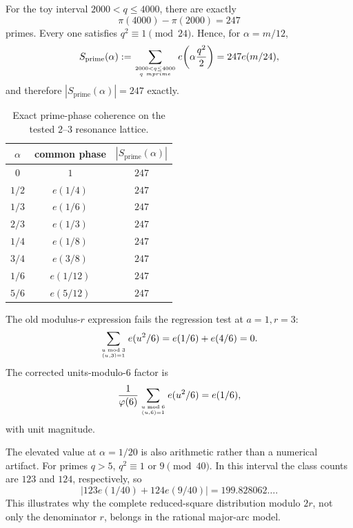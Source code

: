 \documentclass[11pt]{article}
\theoremstyle{definition}
\theoremstyle{remark}
\newcommand{\1}{\mathbf{1}}
\begin{document}
For the toy interval $2000<q\le4000$, there are exactly
\begin{equation}
 \pi(4000)-\pi(2000)=247
 \label{eq:toy-prime-count}
\end{equation}
primes.  Every one satisfies $q^2\equiv1\pmod{24}$.  Hence, for
$\alpha=m/12$,
\begin{equation}
 S_{\mathrm{prime}}(\alpha)
 :=\sum_{2000<q\le4000\atop q\ {
m prime}}
 e\!\left(\alpha\frac{q^2}{2}\right)
 =247e(m/24),
 \label{eq:toy-prime-resonance}
\end{equation}
and therefore $|S_{\mathrm{prime}}(\alpha)|=247$ exactly.

\begin{table}[htbp]
\centering
\caption{Exact prime-phase coherence on the tested $2$--$3$ resonance lattice.}
\label{tab:toy-prime-resonance}
\small
\begin{tabular}{ccc}
\toprule
$\alpha$ & common phase & $|S_{\mathrm{prime}}(\alpha)|$\\
\midrule
$0$ & $1$ & $247$\\
$1/2$ & $e(1/4)$ & $247$\\
$1/3$ & $e(1/6)$ & $247$\\
$2/3$ & $e(1/3)$ & $247$\\
$1/4$ & $e(1/8)$ & $247$\\
$3/4$ & $e(3/8)$ & $247$\\
$1/6$ & $e(1/12)$ & $247$\\
$5/6$ & $e(5/12)$ & $247$\\
\bottomrule
\end{tabular}
\end{table}

The old modulus-$r$ expression fails the regression test at $a=1,r=3$:
\begin{equation}
 \sum_{u\bmod3\atop(u,3)=1}e(u^2/6)=e(1/6)+e(4/6)=0.
 \label{eq:old-r3-regression-failure}
\end{equation}
The corrected units-modulo-$6$ factor is
\begin{equation}
 \frac1{\varphi(6)}
 \sum_{u\bmod6\atop(u,6)=1}e(u^2/6)
 =e(1/6),
 \label{eq:correct-r3-regression}
\end{equation}
with unit magnitude.

The elevated value at $\alpha=1/20$ is also arithmetic rather than a numerical
artifact.  For primes $q>5$, $q^2\equiv1$ or $9\pmod{40}$.  In this interval the
class counts are $123$ and $124$, respectively, so
\begin{equation}
 \left|123e(1/40)+124e(9/40)\right|
 =199.828062\ldots.
 \label{eq:one-twentieth-secondary-resonance}
\end{equation}
This illustrates why the complete reduced-square distribution modulo $2r$, not only
the denominator $r$, belongs in the rational major-arc model.
\end{document}
